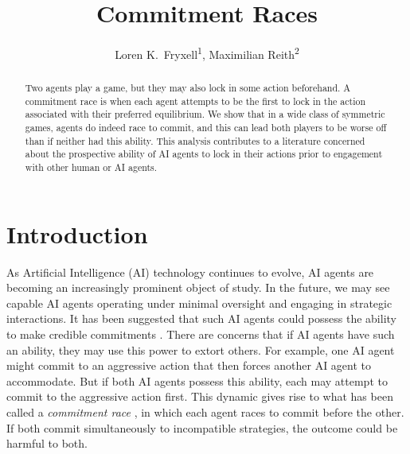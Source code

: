 \documentclass[letterpaper]{article}
\title{Commitment Races}
\author{
  Loren K.\ Fryxell\textsuperscript{\rm 1},
  Maximilian Reith\textsuperscript{\rm 2}
}
\theoremstyle{definition}
\begin{document}
\maketitle
\begin{abstract}
  Two agents play a game, but they may also lock in some action beforehand. A commitment race is when each agent attempts to be the first to lock in the action associated with their preferred equilibrium. We show that in a wide class of symmetric games, agents do indeed race to commit, and this can lead both players to be worse off than if neither had this ability. This analysis contributes to a literature concerned about the prospective ability of AI agents to lock in their actions prior to engagement with other human or AI agents.
\end{abstract}

\section{Introduction}
As Artificial Intelligence (AI) technology continues to evolve, AI agents are becoming an increasingly prominent object of study. In the future, we may see capable AI agents operating under minimal oversight and engaging in strategic interactions. It has been suggested that such AI agents could possess the ability to make credible commitments \citep{hammond_multi-agent_2025}. There are concerns that if AI agents have such an ability, they may use this power to extort others. For example, one AI agent might commit to an aggressive action that then forces another AI agent to accommodate. But if both AI agents possess this ability, each may attempt to commit to the aggressive action first. This dynamic gives rise to what has been called a \textit{commitment race} \citep{kokotajlo_commitment_2019}, in which each agent races to commit before the other. If both commit simultaneously to incompatible strategies, the outcome could be harmful to both.
\end{document}
